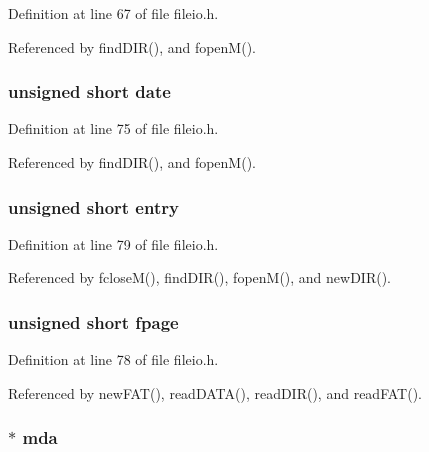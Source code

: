 Definition at line 67 of file fileio.\-h.



Referenced by find\-D\-I\-R(), and fopen\-M().

\hypertarget{struct_m_f_i_l_e_aa5308fb86cfb276522804ceec15b7efe}{
\subsubsection[{date}]{\setlength{\rightskip}{0pt plus 5cm}unsigned short date}}\label{struct_m_f_i_l_e_aa5308fb86cfb276522804ceec15b7efe}


Definition at line 75 of file fileio.\-h.



Referenced by find\-D\-I\-R(), and fopen\-M().

\hypertarget{struct_m_f_i_l_e_aca0461bffb12ab51bb48e6684f46dc43}{
\subsubsection[{entry}]{\setlength{\rightskip}{0pt plus 5cm}unsigned short entry}}\label{struct_m_f_i_l_e_aca0461bffb12ab51bb48e6684f46dc43}


Definition at line 79 of file fileio.\-h.



Referenced by fclose\-M(), find\-D\-I\-R(), fopen\-M(), and new\-D\-I\-R().

\hypertarget{struct_m_f_i_l_e_a90e0ec4ff8507af26396f8eee99ebd52}{
\subsubsection[{fpage}]{\setlength{\rightskip}{0pt plus 5cm}unsigned short fpage}}\label{struct_m_f_i_l_e_a90e0ec4ff8507af26396f8eee99ebd52}


Definition at line 78 of file fileio.\-h.



Referenced by new\-F\-A\-T(), read\-D\-A\-T\-A(), read\-D\-I\-R(), and read\-F\-A\-T().

\hypertarget{struct_m_f_i_l_e_a60a723e90d275009f5a327db27ba0972}{
\subsubsection[{mda}]{$\ast$ mda}}\label{struct_m_f_i_l_e_a60a723e90d275009f5a327db27ba0972}



